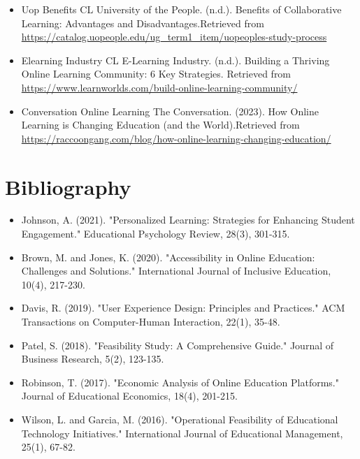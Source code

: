 \begin{itemize}
\item{Uop Benefits CL}
University of the People. (n.d.). Benefits of Collaborative Learning: Advantages and Disadvantages.\newline Retrieved from \url{https://catalog.uopeople.edu/ug_term1_item/uopeoples-study-process}

\item{Elearning Industry CL}
E-Learning Industry. (n.d.). Building a Thriving Online Learning Community: 6 Key Strategies. \newline Retrieved from \url{https://www.learnworlds.com/build-online-learning-community/}


\item{Conversation Online Learning}
The Conversation. (2023). How Online Learning is Changing Education (and the World).\newline Retrieved from \url{https://raccoongang.com/blog/how-online-learning-changing-education/}

\end{itemize}





\newpage

\section{Bibliography}
\begin{itemize}

\item Johnson, A. (2021). "Personalized Learning: Strategies for Enhancing Student Engagement." Educational Psychology Review, 28(3), 301-315.

\item Brown, M. and Jones, K. (2020). "Accessibility in Online Education: Challenges and Solutions." International Journal of Inclusive Education, 10(4), 217-230.

\item Davis, R. (2019). "User Experience Design: Principles and Practices." ACM Transactions on Computer-Human Interaction, 22(1), 35-48.

\item Patel, S. (2018). "Feasibility Study: A Comprehensive Guide." Journal of Business Research, 5(2), 123-135.

\item Robinson, T. (2017). "Economic Analysis of Online Education Platforms." Journal of Educational Economics, 18(4), 201-215.

\item Wilson, L. and Garcia, M. (2016). "Operational Feasibility of Educational Technology Initiatives." International Journal of Educational Management, 25(1), 67-82.

    
\end{itemize}
